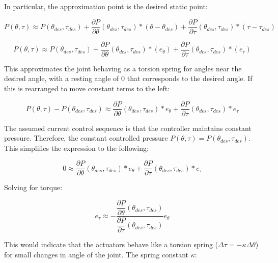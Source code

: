 \documentclass[12pt, letterpaper, oneside, notitlepage, onecolumn]{article}
\begin{document}
In particular, the approximation point is the desired static point:

\begin{equation}
P(\theta, \tau) \approx P(\theta_{des}, \tau_{des}) + 
\dfrac{\partial P}{\partial \theta}(\theta_{des}, \tau_{des}) * (\theta -\theta_{des}) +
\dfrac{\partial P}{\partial \tau}(\theta_{des}, \tau_{des}) * (\tau - \tau_{des})
\end{equation}

\begin{equation}
P(\theta, \tau) \approx P(\theta_{des}, \tau_{des}) + 
\dfrac{\partial P}{\partial \theta}(\theta_{des}, \tau_{des}) * (e_{\theta}) +
\dfrac{\partial P}{\partial \tau}(\theta_{des}, \tau_{des}) * (e_{\tau})
\end{equation}

This approximates the joint behaving as a torsion spring for angles near the
desired angle, with a resting angle of 0 that corresponds to the desired angle.
If this is rearranged to move constant terms to the left:

\begin{equation}
P(\theta, \tau) - P(\theta_{des}, \tau_{des})
\approx
\dfrac{\partial P}{\partial \theta}(\theta_{des}, \tau_{des}) * e_{\theta}
+ \dfrac{\partial P}{\partial \tau}(\theta_{des}, \tau_{des}) * e_{\tau}
\end{equation}

The assumed current control sequence is that the controller maintains constant
pressure. Therefore, the constant controlled pressure $P(\theta, \tau) = 
P(\theta_{des}, \tau_{des})$. This simplifies the expression to the following:

\begin{equation}
0
\approx
\dfrac{\partial P}{\partial \theta}(\theta_{des}, \tau_{des}) * e_{\theta}
+ \dfrac{\partial P}{\partial \tau}(\theta_{des}, \tau_{des}) * e_{\tau}
\end{equation}

Solving for torque:

\begin{equation}
e_{\tau}
\approx
- \dfrac{\dfrac{\partial P}{\partial \theta}(\theta_{des}, \tau_{des})}{
\dfrac{\partial P}{\partial \tau}(\theta_{des}, \tau_{des})}
e_{\theta}
\end{equation}

This would indicate that the actuators behave like a torsion spring ($\Delta \tau =
-\kappa \Delta \theta$) for small changes in angle of the joint. The spring constant $\kappa$:
\end{document}
